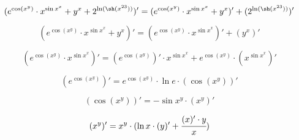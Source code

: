      
\usepackage{upgreek} 

     





\begin{dmath}
({{{{ e } ^ { \cos ({ x } ^ { y })}} \cdot {{ x } ^ {{ \sin  x } ^ { x }}}} + {{ y } ^ { x }}} + {{ 2 } ^ { \ln ( \sh ({ x } ^ { 23 }))}})' = ({{{ e } ^ { \cos ({ x } ^ { y })}} \cdot {{ x } ^ {{ \sin  x } ^ { x }}}} + {{ y } ^ { x }})' + ({ 2 } ^ { \ln ( \sh ({ x } ^ { 23 }))})'
\end{dmath}




\begin{dmath}
({{{ e } ^ { \cos ({ x } ^ { y })}} \cdot {{ x } ^ {{ \sin  x } ^ { x }}}} + {{ y } ^ { x }})' = ({{ e } ^ { \cos ({ x } ^ { y })}} \cdot {{ x } ^ {{ \sin  x } ^ { x }}})' + ({ y } ^ { x })'
\end{dmath}




\begin{dmath}
({{ e } ^ { \cos ({ x } ^ { y })}} \cdot {{ x } ^ {{ \sin  x } ^ { x }}})' = ({ e } ^ { \cos ({ x } ^ { y })})' \cdot { x } ^ {{ \sin  x } ^ { x }} + { e } ^ { \cos ({ x } ^ { y })} \cdot ({ x } ^ {{ \sin  x } ^ { x }})'
\end{dmath}




\begin{dmath}
({ e } ^ { \cos ({ x } ^ { y })})' = { e } ^ { \cos ({ x } ^ { y })} \cdot  \ln  e  \cdot ( \cos ({ x } ^ { y }))'
\end{dmath}




\begin{dmath}
( \cos ({ x } ^ { y }))' =  -  \sin { x } ^ { y } \cdot ({ x } ^ { y })'
\end{dmath}




\begin{dmath}
({ x } ^ { y })' = { x } ^ { y } \cdot ( \ln  x  \cdot ( y )' +  \cfrac {( x )' \cdot  y }{ x })
\end{dmath}




